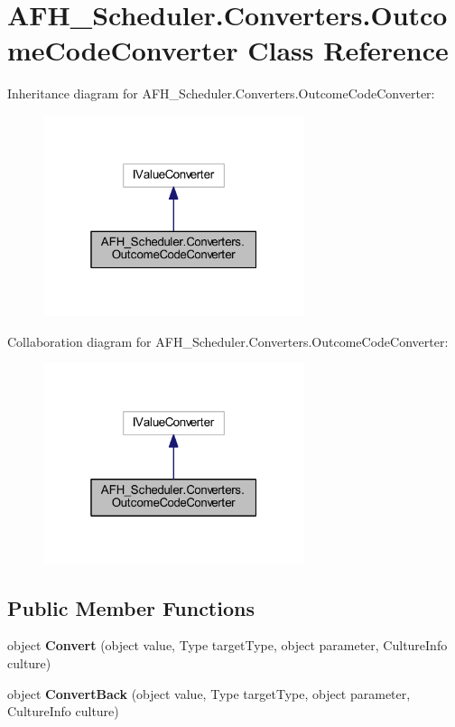 \section{A\+F\+H\+\_\+\+Scheduler.\+Converters.\+Outcome\+Code\+Converter Class Reference}
\label{class_a_f_h___scheduler_1_1_converters_1_1_outcome_code_converter}


Inheritance diagram for A\+F\+H\+\_\+\+Scheduler.\+Converters.\+Outcome\+Code\+Converter\+:
\nopagebreak
\begin{figure}[H]
\begin{center}
\leavevmode
\includegraphics[width=217pt]{class_a_f_h___scheduler_1_1_converters_1_1_outcome_code_converter__inherit__graph}
\end{center}
\end{figure}


Collaboration diagram for A\+F\+H\+\_\+\+Scheduler.\+Converters.\+Outcome\+Code\+Converter\+:
\nopagebreak
\begin{figure}[H]
\begin{center}
\leavevmode
\includegraphics[width=217pt]{class_a_f_h___scheduler_1_1_converters_1_1_outcome_code_converter__coll__graph}
\end{center}
\end{figure}
\subsection*{Public Member Functions}
\begin{DoxyCompactItemize}
\item 
object \textbf{ Convert} (object value, Type target\+Type, object parameter, Culture\+Info culture)
\item 
object \textbf{ Convert\+Back} (object value, Type target\+Type, object parameter, Culture\+Info culture)
\end{DoxyCompactItemize}


